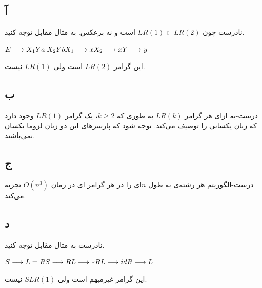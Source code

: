 \documentclass{article}
\begin{document}


\newpage

\section{}%
\subsection{آ}
نادرست-چون
$
LR(1) \subset LR(2)
$
است و نه برعکس. به مثال مقابل توجه کنید.\\
\begin{latin}
$\\
E \longrightarrow  X_1 Y a | X_2 Y b \\
X_1 \longrightarrow  x \\
X_2 \longrightarrow  x \\
Y \longrightarrow  y
$
\end{latin}
این گرامر $LR(2)$ است ولی $LR(1)$ نیست.

\subsection{ب}
درست-به ازای هر گرامر $LR(k)$ به طوری که $k \ge 2$، یک گرامر $LR(1)$ وجود دارد که زبان یکسانی را توصیف می‌کند. توجه شود که پارسرهای این دو زبان لزوما یکسان نمی‌باشند.

\subsection{ج}
درست-الگوریتم  هر رشته‌ی به طول $n$ای را در هر گرامر ای در زمان $O(n^3)$ تجزیه می‌کند.

\subsection{د}
نادرست-به مثال مقابل توجه کنید.\\
\begin{latin}
$\\
S \longrightarrow  L = R \\
S \longrightarrow R \\
L \longrightarrow * R \\
L \longrightarrow id \\
R \longrightarrow L
$
\end{latin}
این گرامر غیرمبهم است ولی $SLR(1)$ نیست.
\end{document}
